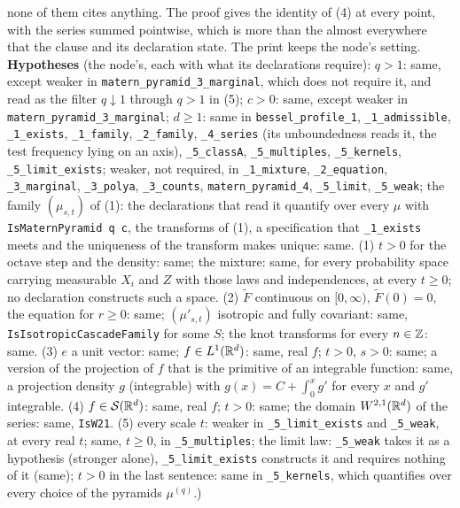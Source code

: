 \begin{theorem}
{none of them cites anything. The proof gives the identity of (4) at every point, with the series
summed pointwise, which is more than the almost everywhere that the clause and its declaration
state.
The print keeps the node's setting. \textbf{Hypotheses} (the node's, each with what its
declarations require): $q > 1$: same, except weaker in \texttt{matern\_pyramid\_3\_marginal}, which
does not require it, and read as the filter $q \downarrow 1$ through $q > 1$ in (5); $c > 0$: same,
except weaker in \texttt{matern\_pyramid\_3\_marginal}; $d \ge 1$: same in
\texttt{bessel\_profile\_1}, \texttt{\_1\_admissible}, \texttt{\_1\_exists}, \texttt{\_1\_family},
\texttt{\_2\_family}, \texttt{\_4\_series} (its unboundedness reads it, the test frequency lying on
an axis), \texttt{\_5\_classA}, \texttt{\_5\_multiples}, \texttt{\_5\_kernels},
\texttt{\_5\_limit\_exists}; weaker, not required, in \texttt{\_1\_mixture}, \texttt{\_2\_equation},
\texttt{\_3\_marginal}, \texttt{\_3\_polya}, \texttt{\_3\_counts}, \texttt{matern\_pyramid\_4},
\texttt{\_5\_limit}, \texttt{\_5\_weak}; the family $(\mu_{s,t})$ of (1): the declarations that
read it quantify over every $\mu$ with \texttt{IsMaternPyramid q c}, the transforms of (1), a
specification that \texttt{\_1\_exists} meets and the uniqueness of the transform makes unique:
same. (1) $t > 0$ for the octave step and the density: same; the mixture: same, for every
probability space carrying measurable $X_i$ and $Z$ with those laws and independences, at every
$t \ge 0$; no declaration constructs such a space. (2) $\widetilde F$ continuous on $[0, \infty)$,
$\widetilde F(0) = 0$, the equation for $r \ge 0$: same; $(\mu'_{s,t})$ isotropic and fully
covariant: same, \texttt{IsIsotropicCascadeFamily} for some $S$; the knot transforms for every
$n \in \mathbb{Z}$: same. (3) $e$ a unit vector: same; $f \in L^1(\mathbb{R}^d)$: same, real $f$; $t > 0$,
$s > 0$: same; a version of the projection of $f$ that is the primitive of an integrable
function: same, a projection density $g$ (integrable) with $g(x) = C + \int_0^xg'$ for every $x$
and $g'$ integrable. (4) $f \in \mathcal{S}(\mathbb{R}^d)$: same, real $f$; $t > 0$: same; the domain
$W^{2,1}(\mathbb{R}^d)$ of the series: same, \texttt{IsW21}. (5) every scale $t$: weaker in
\texttt{\_5\_limit\_exists} and \texttt{\_5\_weak}, at every real $t$; same, $t \ge 0$, in
\texttt{\_5\_multiples}; the limit law: \texttt{\_5\_weak} takes it as a hypothesis (stronger
alone), \texttt{\_5\_limit\_exists} constructs it and requires nothing of it (same); $t > 0$ in the
last sentence: same in \texttt{\_5\_kernels}, which quantifies over every choice of the \Matern{}
pyramids $\mu^{(q)}$.)}
\end{theorem}

